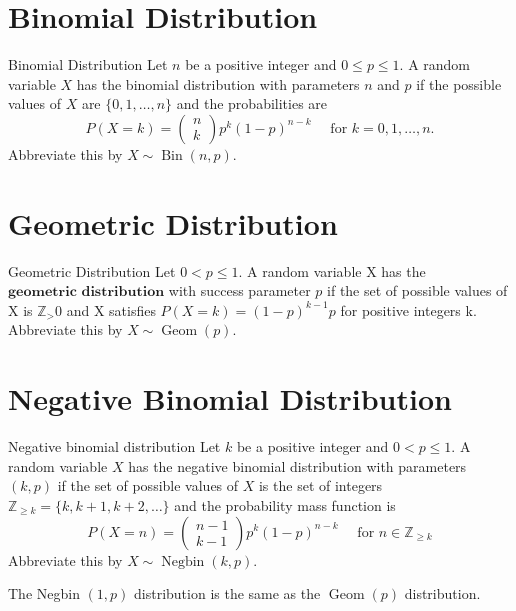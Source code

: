 \documentclass[11pt]{elegantbook}
\begin{document}
\section{Binomial Distribution}

\begin{definition}{Binomial Distribution}
Let $n$ be a positive integer and $0 \leq p \leq 1$. A random variable $X$ has the binomial distribution with parameters $n$ and $p$ if the possible values of $X$ are $\{0,1, \ldots, n\}$ and the probabilities are
$$
P(X=k)=\left(\begin{array}{l}
n \\
k
\end{array}\right) p^k(1-p)^{n-k} \quad \text { for } k=0,1, \ldots, n .
$$
Abbreviate this by $X \sim \operatorname{Bin}(n, p)$.
\end{definition}

\section{Geometric Distribution}
\begin{definition}{Geometric Distribution}
    Let $ 0 < p \le 1$. A random variable X has the $\textbf{geometric distribution} $ with success parameter $p$ if the set of possible values of X is $\mathbb{Z}_>0$ and X satisfies $P(X = k) = (1-p)^{k-1}p$ for positive integers k. Abbreviate this by $X \sim \operatorname{Geom}(p)$.
\end{definition}

\section{Negative Binomial Distribution}

\begin{definition}{Negative binomial distribution}
 Let $k$ be a positive integer and $0<p \leq 1$. A random variable $X$ has the negative binomial distribution with parameters $(k, p)$ if the set of possible values of $X$ is the set of integers $\mathbb{Z}_{\geq k}=\{k, k+1, k+2, \ldots\}$ and the probability mass function is
    $$
    P(X=n)=\left(\begin{array}{l}
    n-1 \\
    k-1
    \end{array}\right) p^k(1-p)^{n-k} \quad \text { for } n \in \mathbb{Z}_{\geq k}
    $$
    Abbreviate this by $X \sim \operatorname{Negbin}(k, p)$.

\end{definition}
\begin{note}
    The Negbin $(1, p)$ distribution is the same as the $\operatorname{Geom}(p)$ distribution.
\end{note}
\end{document}
